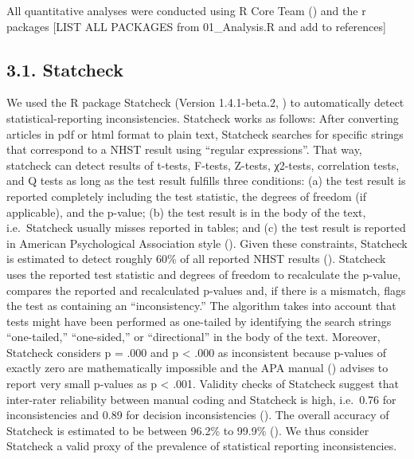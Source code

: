 \documentclass[
  doc,
  longtable,
  nolmodern,
  notxfonts,
  notimes,
  colorlinks=true,linkcolor=blue,citecolor=blue,urlcolor=blue]{apa7}
\begin{document}
All quantitative analyses were conducted using R Core Team
() and the r packages {[}LIST ALL PACKAGES
from 01\_Analysis.R and add to references{]}

\subsection{3.1. Statcheck}\label{statcheck}

We used the R package Statcheck (Version 1.4.1-beta.2,
) to
automatically detect statistical-reporting inconsistencies. Statcheck
works as follows: After converting articles in pdf or html format to
plain text, Statcheck searches for specific strings that correspond to a
NHST result using ``regular expressions''. That way, statcheck can
detect results of t-tests, F-tests, Z-tests, χ2-tests, correlation
tests, and Q tests as long as the test result fulfills three conditions:
(a) the test result is reported completely including the test statistic,
the degrees of freedom (if applicable), and the p-value; (b) the test
result is in the body of the text, i.e.~Statcheck usually misses
reported in tables; and (c) the test result is reported in American
Psychological Association style (). Given these constraints, Statcheck is
estimated to detect roughly 60\% of all reported NHST results
(). Statcheck
uses the reported test statistic and degrees of freedom to recalculate
the p-value, compares the reported and recalculated p-values and, if
there is a mismatch, flags the test as containing an ``inconsistency.''
The algorithm takes into account that tests might have been performed as
one-tailed by identifying the search strings ``one-tailed,''
``one-sided,'' or ``directional'' in the body of the text. Moreover,
Statcheck considers p = .000 and p \textless{} .000 as inconsistent
because p-values of exactly zero are mathematically impossible and the
APA manual () advises to report very small p-values as p \textless{} .001.
Validity checks of Statcheck suggest that inter-rater reliability
between manual coding and Statcheck is high, i.e.~0.76 for
inconsistencies and 0.89 for decision inconsistencies
(). The
overall accuracy of Statcheck is estimated to be between 96.2\% to
99.9\% (). We
thus consider Statcheck a valid proxy of the prevalence of statistical
reporting inconsistencies.
\end{document}

